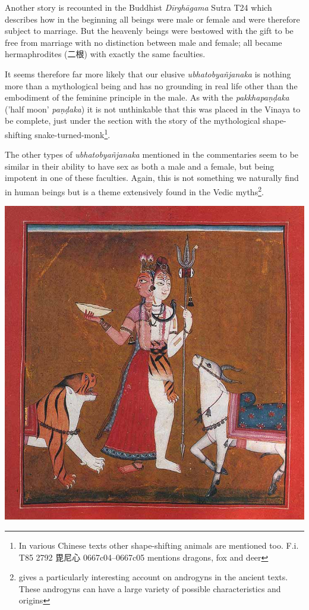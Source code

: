 Another story is recounted in the Buddhist {\em Dīrghāgama} Sutra T24 which describes how in the beginning all beings were male or female and were therefore subject to marriage. But the heavenly beings were bestowed with the gift to be free from marriage with no distinction between male and female; all became hermaphrodites (二根) with exactly the same faculties.

It seems therefore far more likely that our elusive {\em ubhatob­yañ­janaka} is nothing more than a mythological being and has no grounding in real life other than the embodiment of the feminine principle in the male. As with the {\em pakkhapaṇḍaka} ('half moon' {\em paṇḍaka}) it is not unthinkable that this was placed in the Vinaya to be complete, just under the section with the story of the mythological shape-shifting snake-turned-monk\footnote{In various Chinese texts other shape-shifting animals are mentioned too. F.i. T85 2792 毘尼心 0667c04–0667c05 mentions dragons, fox and deer}.

The other types of {\em ubhatob­yañ­janaka} mentioned in the commentaries seem to be similar in their ability to have sex as both a male and a female, but being impotent in one of these faculties. Again, this is not something we naturally find in human beings but is a theme extensively found in the Vedic myths\footnote{\cite{wendy} gives a particularly interesting account on androgyns in the ancient texts. These androgyns can have a large variety of possible characteristics and origins}.

\bigskip
\includegraphics[width=\textwidth]{androgyne.jpg}

